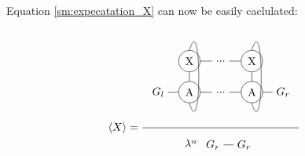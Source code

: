 Equation \cref{sm:expecatation_X} can now be easily caclulated:

\begin{equation}
    \Braket{X} = \frac{
        \begin{tikzpicture} [   ]
            \clip (-0.5,-1) rectangle (4.5,2);

            \node[] (N1) at (0,0) {$G_l$};
            \node[circle, draw] (N2) at (1,0) {A};
            \node[circle, draw] (X2) at (1,1) {X};

            \node[] (N3) at (2 ,0) {...};
            \node[] (X3) at (2,1) {...};

            \node[circle, draw] (N4) at (3 ,0) {A};
            \node[circle, draw] (X4) at (3,1) {X};

            \node[] (N5) at (4 ,0) {$G_r$};

            \draw  (N1) -- (N2) ;
            \draw  (N2) -- (N3) ;
            \draw  (N3) -- (N4) ;
            \draw  (N4) -- (N5) ;

            \draw  (X2) -- (X3) ;
            \draw  (X3) -- (X4) ;

            \draw  (N2) -- (X2) ;
            \draw  (N4) -- (X4) ;

            \draw (X2.north)   .. controls +(0.4,1.4) and +(0.4,-1.4) .. (N2.south);
            \draw (X4.north)   .. controls +(0.4,1.4) and +(0.4,-1.4) .. (N4.south);

        \end{tikzpicture}
    }{
        \lambda^n
        \begin{tikzpicture}[baseline={0cm-0.5*height("$=$")} ]
            \clip (-0.5,-0.5) rectangle (1.4,0.5);
            \node[] (N2) at (1,0) {$G_r$};
            \node[] (N1) at (0,0) {$G_r$};
            \draw  (N1) -- (N2) ;
        \end{tikzpicture}
    }
    \label{sm:expecatation_X_2}
\end{equation}

